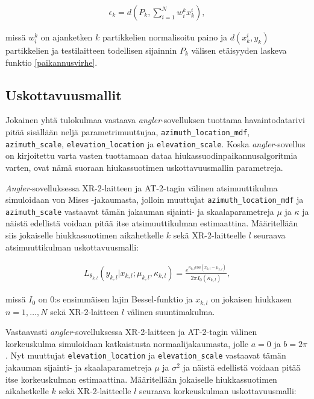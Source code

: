 \documentclass[
  12pt,
  a4paper, twoside]{book}
\begin{document}
\begin{align}
\epsilon_k = d(P_k, \sum_{i=1}^Nw^k_ix^i_k),
\end{align}

\noindent missä \(w_i^k\) on ajanketken \(k\) partikkelien normalisoitu paino ja \(d(x^i_k,y_k)\) partikkelien ja testilaitteen todellisen sijainnin \(P_k\) välisen etäisyyden laskeva funktio \ref{paikannusvirhe}.

\hypertarget{uskottavuusmallit}{%
\subsection{Uskottavuusmallit}\label{uskottavuusmallit}}

Jokainen yhtä tulokulmaa vastaava \emph{angler}-sovelluksen tuottama havaintodatarivi pitää sisällään neljä parametrimuuttujaa, \texttt{azimuth\_location\_mdf}, \texttt{azimuth\_scale}, \texttt{elevation\_location} ja \texttt{elevation\_scale}. Koska \emph{angler}-sovellus on kirjoitettu varta vasten tuottamaan dataa hiukassuodinpaikannusalgoritmia varten, ovat nämä suoraan hiukassuotimen uskottavuusmallin parametreja.

\emph{Angler}-sovelluksessa XR-2-laitteen ja AT-2-tagin välinen atsimuuttikulma simuloidaan von Mises -jakaumasta, jolloin muuttujat \texttt{azimuth\_location\_mdf} ja \texttt{azimuth\_scale} vastaavat tämän jakauman sijainti- ja skaalaparametreja \(\mu\) ja \(\kappa\) ja näistä edellistä voidaan pitää itse atsimuuttikulman estimaattina. Määritellään siis jokaiselle hiukkassuotimen aikahetkelle \(k\) sekä XR-2-laitteelle \(l\) seuraava atsimuuttikulman uskottavuusmalli:

\begin{align}\label{atsimuutti-uskottavuusmalli}
L_{\theta_{k,l}}(y_{k,l}|x_{k,l}; \mu_{k,l}, \kappa_{k,l})=\frac{e^{\kappa_{k,l} \text{cos}(x_{k,l}-\mu_{k,l})}}{2 \pi I_0(\kappa_{k,l})},
\end{align}

missä \(I_0\) on 0:s ensimmäisen lajin Bessel-funktio ja \(x_{k,l}\) on jokaisen hiukkasen \(n=1,\ldots,N\) sekä XR-2-laitteen \(l\) välinen suuntimakulma.

Vastaavasti \emph{angler}-sovelluksessa XR-2-laitteen ja AT-2-tagin välinen korkeuskulma simuloidaan katkaistusta normaalijakaumasta, jolle \(a=0\) ja \(b=2 \pi\). Nyt muuttujat \texttt{elevation\_location} ja \texttt{elevation\_scale} vastaavat tämän jakauman sijainti- ja skaalaparametreja \(\mu\) ja \(\sigma^2\) ja näistä edellistä voidaan pitää itse korkeuskulman estimaattina. Määritellään jokaiselle hiukkassuotimen aikahetkelle \(k\) sekä XR-2-laitteelle \(l\) seuraava korkeuskulman uskottavuusmalli:
\end{document}
